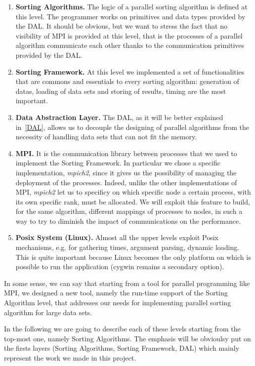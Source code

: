 \begin{enumerate}
\item \textbf{Sorting Algorithms.} The logic of a parallel sorting algorithm is defined at this level. The programmer works on primitives and data types provided by the DAL. It should be obvious, but we want to stress the fact that no visibility of MPI is provided at this level, that is the processes of a parallel algorithm communicate each other thanks to the communication primitives provided by the DAL.  
\item \textbf{Sorting Framework.} At this level we implemented a set of functionalities that are commons and essentials to every sorting algorithm: generation of datas, loading of data sets and storing of results, timing are the most important. 
\item \textbf{Data Abstraction Layer.} The DAL, as it will be better explained in~\ref{DAL}, allows us to decouple the designing of parallel algorithms from the necessity of handling data sets that can not fit the memory. 
\item \textbf{MPI.} It is the communication library between processes that we used to implement the Sorting Framework. In particular we chose a specific implementation, \textit{mpich2}, since it gives us the possibility of managing the deployment of the processes. Indeed, unlike the other implementations of MPI, \textit{mpich2} let us to specificy on which specific node a certain process, with its own specific rank, must be allocated. We will exploit this feature to build, for the same algorithm, different mappings of processes to nodes, in such a way to try to diminish the impact of communications on the performance. 
\item \textbf{Posix System (Linux).} Almost all the upper levels exploit Posix mechanisms, e.g. for gathering times, argument parsing, dynamic loading. This is quite important because Linux becomes the only platform on which is possible to run the application (cygwin remains a secondary option). 
\end{enumerate}
In some sense, we can say that starting from a tool for parallel programming like MPI, we designed a new tool, namely the run-time support of the Sorting Algorithm level, that addresses our needs for implementing parallel sorting algorithm for large data sets. 

In the following we are going to describe each of these levels starting from the top-most one, namely Sorting Algorithms. The emphasis will be obvioulsy put on the firsts layers (Sorting Algorithms, Sorting Framework, DAL) which mainly represent the work we made in this project.


